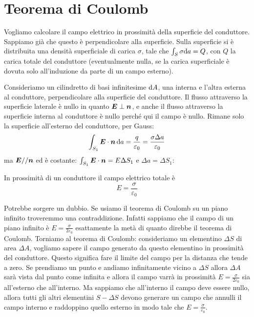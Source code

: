 \section{Teorema di Coulomb}
Vogliamo calcolare il campo elettrico in prossimità della superficie del conduttore. Sappiamo già che questo è perpendicolare alla superficie. Sulla superficie si è distribuita una densità superficiale di carica $\sigma$, tale che $\int_S \sigma\mathrm{d} a=Q$, con $Q$ la carica totale del conduttore (eventualmente nulla, se la carica superficiale è dovuta solo all'induzione da parte di un campo esterno).

Consideriamo un cilindretto di basi infinitesime $\mathrm{d} A$, una interna e l'altra esterna al conduttore, perpendicolare alla superficie del conduttore. Il flusso attraverso la superficie laterale è nullo in quanto $\boldsymbol{E}\perp\boldsymbol{n}$, e anche il flusso attraverso la superficie interna al conduttore è nullo perché qui il campo è nullo. Rimane solo la superficie all'esterno del conduttore, per Gauss:
\[\int_{S_1}\boldsymbol{E}\cdot\boldsymbol{n}\,\mathrm{d} a=\frac{q}{\varepsilon_0}=\frac{\sigma\Delta a}{\varepsilon_0}\]
ma $\boldsymbol{E}//\boldsymbol{n}$ ed è costante: $\int_{S_1}\boldsymbol{E}\cdot\boldsymbol{n}=E\Delta S_1$ e $\Delta a = \Delta S_1$:
\begin{Teo}[Coulomb]
  In prossimità di un conduttore il campo elettrico totale è
  \begin{equation}
    \label{eq:teo_coulomb}
    E=\frac{\sigma}{\varepsilon_0}
  \end{equation}
\end{Teo}

Potrebbe sorgere un dubbio. Se usiamo il teorema di Coulomb su un piano infinito troveremmo una contraddizione. Infatti sappiamo che il campo di un piano infinito è $E=\frac{\sigma}{2\varepsilon_0}$ esattamente la metà di quanto direbbe il teorema di Coulomb. Torniamo al teorema di Coulomb: consideriamo un elementino $\Delta S$ di area $\Delta A$, vogliamo sapere il campo generato da questo elementino in prossimità del conduttore. Questo significa fare il limite del campo per la distanza che tende a zero. Se prendiamo un punto e andiamo infinitamente vicino a $\Delta S$ allora $\Delta A$ sarà vista dal punto come infinita e allora il campo varrà in prossimità $E=\frac{\sigma}{2\varepsilon_0}$ sia all'esterno che all'interno. Ma sappiamo che all'interno il campo deve essere nullo, allora tutti gli altri elementini $S-\Delta S$ devono generare un campo che annulli il campo interno e raddoppino quello esterno in modo tale che $E=\frac{\sigma}{\varepsilon_0}$.

